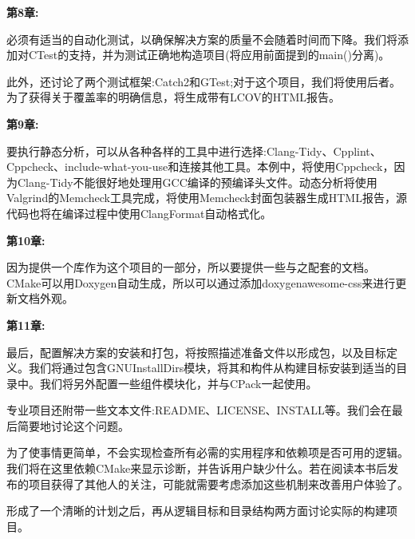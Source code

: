 \textbf{第8章:}

必须有适当的自动化测试，以确保解决方案的质量不会随着时间而下降。我们将添加对CTest的支持，并为测试正确地构造项目(将应用前面提到的main()分离)。

此外，还讨论了两个测试框架:Catch2和GTest;对于这个项目，我们将使用后者。为了获得关于覆盖率的明确信息，将生成带有LCOV的HTML报告。

\textbf{第9章:}

要执行静态分析，可以从各种各样的工具中进行选择:Clang-Tidy、Cpplint、Cppcheck、include-what-you-use和连接其他工具。本例中，将使用Cppcheck，因为Clang-Tidy不能很好地处理用GCC编译的预编译头文件。动态分析将使用Valgrind的Memcheck工具完成，将使用Memcheck封面包装器生成HTML报告，源代码也将在编译过程中使用ClangFormat自动格式化。

\textbf{第10章:}

因为提供一个库作为这个项目的一部分，所以要提供一些与之配套的文档。CMake可以用Doxygen自动生成，所以可以通过添加doxygenawesome-css来进行更新文档外观。

\textbf{第11章:}

最后，配置解决方案的安装和打包，将按照描述准备文件以形成包，以及目标定义。我们将通过包含GNUInstallDirs模块，将其和构件从构建目标安装到适当的目录中。我们将另外配置一些组件模块化，并与CPack一起使用。

专业项目还附带一些文本文件:README、LICENSE、INSTALL等。我们会在最后简要地讨论这个问题。

\begin{tcolorbox}[colback=blue!5!white,colframe=blue!75!black,title=Note]
为了使事情更简单，不会实现检查所有必需的实用程序和依赖项是否可用的逻辑。我们将在这里依赖CMake来显示诊断，并告诉用户缺少什么。若在阅读本书后发布的项目获得了其他人的关注，可能就需要考虑添加这些机制来改善用户体验了。
\end{tcolorbox}

形成了一个清晰的计划之后，再从逻辑目标和目录结构两方面讨论实际的构建项目。
















